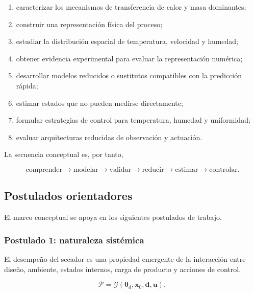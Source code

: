 \begin{enumerate}
    \item caracterizar los mecanismos de transferencia de calor y masa dominantes;
    \item construir una representación física del proceso;
    \item estudiar la distribución espacial de temperatura, velocidad y humedad;
    \item obtener evidencia experimental para evaluar la representación numérica;
    \item desarrollar modelos reducidos o sustitutos compatibles con la predicción rápida;
    \item estimar estados que no pueden medirse directamente;
    \item formular estrategias de control para temperatura, humedad y uniformidad;
    \item evaluar arquitecturas reducidas de observación y actuación.
\end{enumerate}

La secuencia conceptual es, por tanto,

\begin{equation}
\boxed{
\text{comprender}
\rightarrow
\text{modelar}
\rightarrow
\text{validar}
\rightarrow
\text{reducir}
\rightarrow
\text{estimar}
\rightarrow
\text{controlar}.
}
\label{eq:secuencia_objetivos}
\end{equation}

\subsection{Postulados orientadores}
\label{subsec:postulados_orientadores}

El marco conceptual se apoya en los siguientes postulados de trabajo.

\subsubsection*{Postulado 1: naturaleza sistémica}

El desempeño del secador es una propiedad emergente de la interacción entre diseño, ambiente, estados internos, carga de producto y acciones de control.

\begin{equation}
\mathcal{P}
=
\mathcal{G}
\left(
\boldsymbol{\theta}_d,
\mathbf{x}_0,
\mathbf{d},
\mathbf{u}
\right),
\end{equation}

